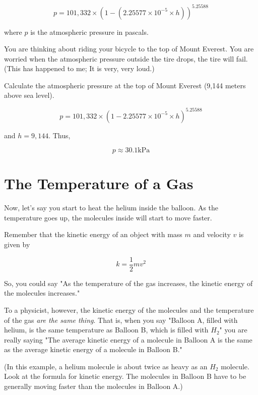$$p = 101,332 \times \left(1 - \left( 2.25577 \times 10^{-5} \times h\right) \right)^{5.25588}$$

where $p$ is the atmospheric pressure in pascals.

\begin{Exercise}[title={Atmospheric Pressure},  label=atmos_pressure]
  
You are thinking about riding your bicycle to the top of Mount Everest.  You are worried when the atmospheric pressure outside the tire drops,  the tire will fail.  
(This has happened to me; It is very, very loud.)  

Calculate the atmospheric pressure at the top of Mount Everest (9,144 meters above sea level).

\end{Exercise}
\begin{Answer}[ref=atmos_pressure]

$$p = 101,332 \times \left(1 - 2.25577 \times 10^{-5} \times h\right)^{5.25588}$$

and $h = 9,144$.  Thus,

$$p \approx 30.1 \text{kPa}$$

\end{Answer}

\section{The Temperature of a Gas}

Now,  let's say you start to heat the helium inside the balloon.  As the temperature goes up,  the molecules inside will start to move faster.

Remember that the kinetic energy of an object with mass $m$ and velocity $v$ is given by

$$k = \frac{1}{2} m v^2$$

So, you could say "As the temperature of the gas increases,  the kinetic energy of the molecules increases."

To a physicist, however, the kinetic energy of the molecules and the temperature of the gas \emph{are the same thing}.  
That is, when you say "Balloon A, filled with helium, is the same temperature as Balloon B, which is filled with $H_2$"  
you are really saying "The average kinetic energy of a molecule in Balloon A is the same as the average kinetic energy of a molecule in Balloon B."

(In this example,  a helium molecule is about twice as heavy as an $H_2$ molecule.   Look at the formula for kinetic energy.
The molecules in Balloon B have to be generally moving faster than the molecules in Balloon A.)

